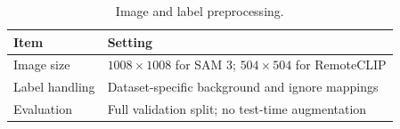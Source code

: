 \begin{table}[!t]
\centering
\caption{Image and label preprocessing.}
\label{tab:dataset_processing}
\small
\begin{tabular}{lL{0.60\columnwidth}}
\toprule
Item & Setting\\
\midrule
Image size & $1008\times1008$ for SAM 3; $504\times504$ for RemoteCLIP\\
Label handling & Dataset-specific background and ignore mappings\\
Evaluation & Full validation split; no test-time augmentation\\
\bottomrule
\end{tabular}
\end{table}

